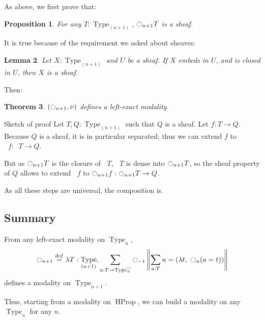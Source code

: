 \documentclass{beamer}
\newtheorem{thm}{Theorem}
\newtheorem{prop}[thm]{Proposition}
\newtheorem{lem}[thm]{Lemma}
\newcommand \defeq {\overset{de\hspace{-0.2ex}f}{=}}
\DeclareMathOperator{\Type}{Type}
\DeclareMathOperator{\HProp}{HProp}
\newcommand{\modal}{\ensuremath{\ocircle}}
\newcommand \separated {\mathop{\square_{n+1}} }
\newcommand{\nType}[1]{\Type_{#1}}
\begin{document}
\begin{frame}
  \note{ }
  As above, we first prove that:
  \begin{prop}
    For any $T:\nType {(n+1)}$, $\modal_{n+1}T$ is a sheaf.
  \end{prop}
  It is true because of the requirement we asked about sheaves:
  \begin{lem}
    Let $X:\nType {(n+1)}$ and $U$ be a sheaf. If $X$ embeds
    in $U$, and is closed in $U$, then $X$ is a sheaf.
  \end{lem}

  \pause
  \vspace{1em}

  Then:
  \begin{thm}
    $(\modal_{n+1},\nu)$ defines a left-exact modality.
  \end{thm}
\end{frame}

\begin{frame}{Sketch of proof}
  Let $T,Q:\nType {(n+1)}$ such that $Q$ is a sheaf. Let $f:T\to Q$.
  Because $Q$ is a sheaf, it is in particular separated;
  thus we can extend $f$ to $\separated f:\separated T\to Q$.
  \pause
  \vspace{1em}

  But as $\modal_{n+1} T$ is the closure of $\separated T$, $\separated T$ is dense
  into $\modal_{n+1} T$, so the sheaf property of $Q$ allows to extend
  $\separated f$ to $\modal_{n+1} f:\modal_{n+1} T \to Q$.

  As all these steps are universal, the composition is.
\end{frame}

\subsection{Summary}
\label{sec:consequences}

\begin{frame}
  From any left-exact modality on $\Type_n$,
  \[\displaystyle{\modal_{n+1} \defeq  \lambda T:\nType {(n+1)}},
  \sum_{u:T \to \nType n^\modal} \modal_{-1} 
  \left\|
    \sum_{a:T} u= (\lambda t,~\modal_n (a=t))
  \right\|\]
  defines a modality on $\Type_{n+1}$.

  \bigskip

  Thus, starting from a modality on $\HProp$, we can build a modality
  on any $\Type_n$ for any $n$.
\end{frame}
\end{document}
